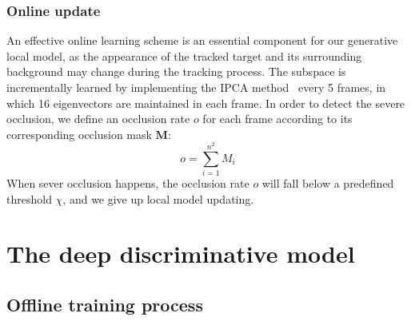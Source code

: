 \documentclass[preprint,12pt,review]{elsarticle}
\begin{document}
\subsubsection{Online update}
An effective online learning scheme is an essential component for our generative local model, as the appearance of the tracked target and its surrounding background may change during the tracking process.
%
The subspace is incrementally learned by implementing the IPCA method~\cite{ross2008incremental} every 5 frames, in which 16 eigenvectors are maintained in each frame.
%
In order to detect the severe occlusion, we define an occlusion rate $o$ for each frame according to its corresponding occlusion mask $\mathbf{M}$:
\begin{equation}
  o=\sum \limits_{i=1}^{n^2} M_i \end{equation}
When sever occlusion happens, the occlusion rate $o$ will fall below a predefined threshold $\chi $, and we give up local model updating.
%
%
%
%

\section{The deep discriminative model}
\subsection{Offline training process}
\end{document}
